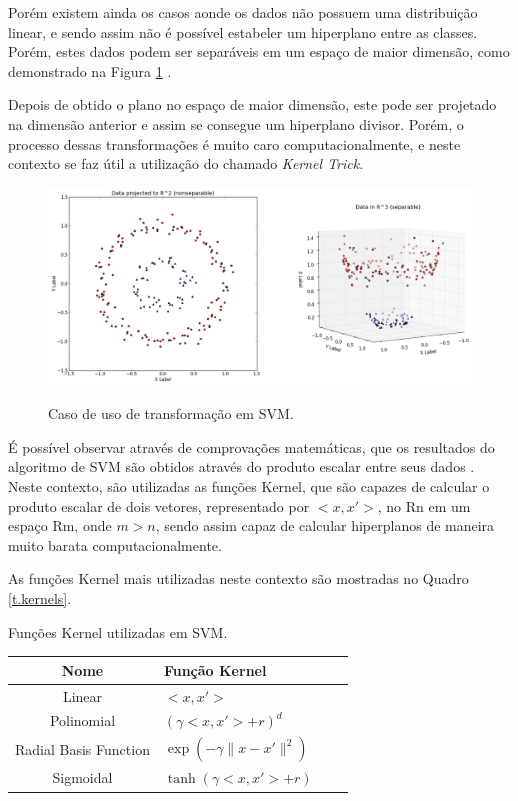 Porém existem ainda os casos aonde os dados não possuem uma distribuição linear, e sendo assim não é possível estabeler um hiperplano entre as classes. Porém, estes dados podem ser separáveis em um espaço de maior dimensão, como demonstrado na Figura \ref{f.svm-transformacao} \cite{kim2013everything}. 

Depois de obtido o plano no espaço de maior dimensão, este pode ser projetado na dimensão anterior e assim se consegue um hiperplano divisor. Porém, o processo dessas transformações é muito caro computacionalmente, e neste contexto se faz útil a utilização do chamado \textit{Kernel Trick}.

\begin{figure}[ht]
\caption{\small Caso de uso de transformação em SVM.}
\centering
\includegraphics[scale=0.40]{figs/svm-2dto3d.png}
\label{f.svm-transformacao}
\end{figure}

É possível observar através de comprovações matemáticas, que os resultados do algoritmo de SVM são obtidos através do produto escalar entre seus dados \cite{jordan2004kernel}. Neste contexto, são utilizadas as funções Kernel, que são capazes de calcular o produto escalar de dois vetores, representado por $<x,x'>$, no Rn em um espaço Rm, onde $m > n$, sendo assim capaz de calcular hiperplanos de maneira muito barata computacionalmente.

As funções Kernel mais utilizadas neste contexto são mostradas no Quadro \ref{t.kernels}.

\begin{quadro}[h]
\caption{Funções Kernel utilizadas em SVM.}
\centering
\begin{tabular}{|c p{5cm}|l p{5cm}}
\hline
\textbf{\small Nome} & \textbf{\small Função Kernel}\\\hline \hline
{\small Linear} & {\small $<x,x'>$}\\\hline
{\small Polinomial} & {\small $(\gamma<x,x'> + r)^{d}$}\\\hline
{\small Radial Basis Function} & {\small $\exp(-\gamma \parallel x - x' \parallel^{2})$}\\\hline
{\small Sigmoidal} & {\small $\tanh(\gamma<x,x'> + r)$}\\\hline
\end{tabular}
\label{t.kernels}
\end{quadro}

